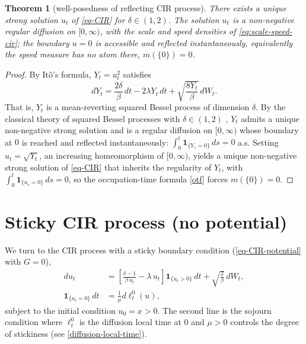 \documentclass[aap,preprint]{imsart}
\numberwithin{equation}{section}
\theoremstyle{plain}
\newtheorem{theorem}{Theorem}[section]
\theoremstyle{definition}
\begin{document}
\begin{theorem}[well-posedness of reflecting CIR process]\label{thm-wp}
There exists a unique strong solution \(u_t\) of \cref{eq-CIR}
for \(\delta\in(1,2)\). The solution \(u_t\) is a non-negative regular diffusion
on $[0,\infty)$, with the scale and speed densities
of \eqref{eq:scale-speed-cir}; the boundary \(u=0\) is accessible and reflected
instantaneously, equivalently the speed measure has no atom there, $m(\{0\}) = 0$.
\end{theorem}
%
\begin{proof}
By It\^o's formula, $Y_t = u_t^2$ satisfies
\begin{equation}\label{eq-CIR2}
dY_t = \frac{2\delta}{\beta}\,dt - 2\lambda Y_t\,dt + \sqrt{\frac{8 Y_t}{\beta}}\,dW_t.
\end{equation}
That is, $Y_t$ is a mean-reverting squared Bessel process of dimension $\delta$.  By the classical theory of squared Bessel processes with $\delta\in(1,2)$ \citep[Section~3]{GoingJaeschkeYor2003}, $Y_t$ admits a unique non-negative strong solution and is a regular diffusion on $[0,\infty)$ whose boundary at $0$ is reached and reflected instantaneously: $\int_0^t \mathbf{1}_{\{Y_s = 0\}}\,ds = 0$ a.s.  Setting $u_t = \sqrt{Y_t}$, an increasing homeomorphism of $[0,\infty)$, yields a unique non-negative strong solution of \cref{eq-CIR} that inherits the regularity of $Y_t$, with $\int_0^t \mathbf{1}_{\{u_s=0\}}\,ds = 0$, so the occupation-time formula \cref{otf} forces $m(\{0\}) = 0$.
\end{proof}



\section{Sticky CIR process (no potential)}\label{sticky-cir-process}

We turn to the CIR process with a sticky boundary condition (\cref{eq-CIR-potential} with $G=0$), 
\begin{equation}\label{eq-CIR4}{
\begin{aligned}
      du_t&=\left[\frac{\delta-1}{\beta \,u_t} - \lambda\, u_t \right]\mathbf{1}_{\{u_t>0\}}\,dt + \sqrt{\frac{2}{\beta}}\,dW_t ,\\
\mathbf{1}_{\{u_t=0\}}\,dt&=\frac{1}{\mu}d\ell_t^0(u),
\end{aligned}
}\end{equation} 
subject to the initial condition $u_0=x>0$. The second line is the sojourn condition where $\ell_t^0$ is the diffusion
local time at $0$ and $\mu>0$ controls the degree of stickiness (see \cref{diffusion-local-time}).
\end{document}
